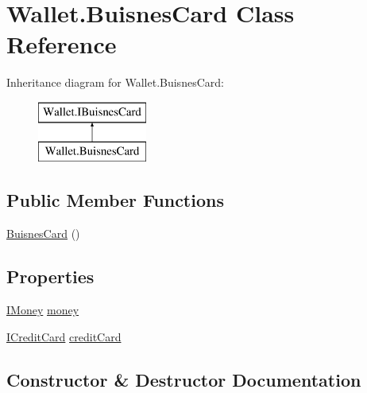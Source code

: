 \hypertarget{class_wallet_1_1_buisnes_card}{}\section{Wallet.\+Buisnes\+Card Class Reference}
\label{class_wallet_1_1_buisnes_card}
Inheritance diagram for Wallet.\+Buisnes\+Card\+:\begin{figure}[H]
\begin{center}
\leavevmode
\includegraphics[height=2.000000cm]{class_wallet_1_1_buisnes_card}
\end{center}
\end{figure}
\subsection*{Public Member Functions}
\begin{DoxyCompactItemize}
\item 
\hyperlink{class_wallet_1_1_buisnes_card_af040429a5b6fbb5e17df48f817a3c19c}{Buisnes\+Card} ()
\end{DoxyCompactItemize}
\subsection*{Properties}
\begin{DoxyCompactItemize}
\item 
\hyperlink{interface_wallet_1_1_i_money}{I\+Money} \hyperlink{class_wallet_1_1_buisnes_card_ad34b055b2670cd2d67eab4c8f18e6b40}{money}
\item 
\hyperlink{interface_wallet_1_1_i_credit_card}{I\+Credit\+Card} \hyperlink{class_wallet_1_1_buisnes_card_a87a31a78633e0f80607c1f6b3ab0c6e9}{credit\+Card}
\end{DoxyCompactItemize}


\subsection{Constructor \& Destructor Documentation}
\hypertarget{class_wallet_1_1_buisnes_card_af040429a5b6fbb5e17df48f817a3c19c}{}\label{class_wallet_1_1_buisnes_card_af040429a5b6fbb5e17df48f817a3c19c} 
